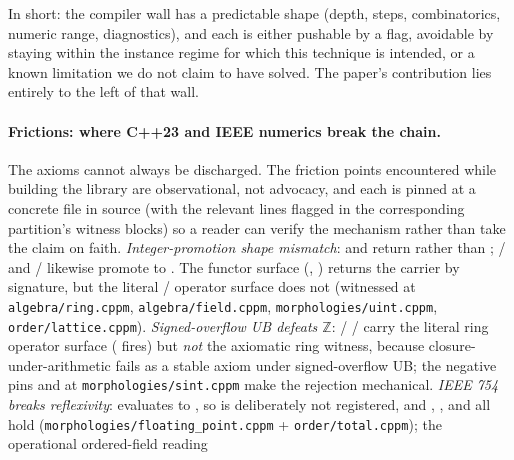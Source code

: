 \documentclass[11pt, a4paper]{article}
\begin{document}
In short: the compiler wall has a predictable shape (depth, steps,
combinatorics, numeric range, diagnostics), and each is either
pushable by a flag, avoidable by staying within the instance regime
for which this technique is intended, or a known limitation we do not
claim to have solved. The paper's contribution lies entirely to the
left of that wall.

\paragraph{Frictions: where C++23 and IEEE numerics break the chain.}
The axioms cannot always be discharged. The friction points encountered while
building the library are observational, not advocacy, and each is
pinned at a concrete file in source (with the relevant lines flagged
in the corresponding partition's witness blocks) so a reader can
verify the mechanism rather than take the claim on faith.
\emph{Integer-promotion shape mismatch}:  and
 return  rather than
;  /
 and
 /
 likewise promote to
. The functor surface
(, )
returns the carrier by signature, but the literal \cppinline{+} /
\cppinline{*} operator surface does not (witnessed at
\texttt{algebra/ring.cppm}, \texttt{algebra/field.cppm},
\texttt{morphologies/uint.cppm}, \texttt{order/lattice.cppm}).
\emph{Signed-overflow UB defeats $\mathbb{Z}$}:  /
 /  carry the literal ring
operator surface
( fires) but \emph{not} the
axiomatic ring witness, because closure-under-arithmetic fails as a
stable axiom under signed-overflow UB; the negative pins
 and
 at
\texttt{morphologies/sint.cppm} make the rejection mechanical.
\emph{IEEE 754 breaks reflexivity}: 
evaluates to , so
 is deliberately
not registered, and ,
, and
all hold (\texttt{morphologies/floating\_point.cppm} +
\texttt{order/total.cppm}); the operational ordered-field reading
\end{document}
